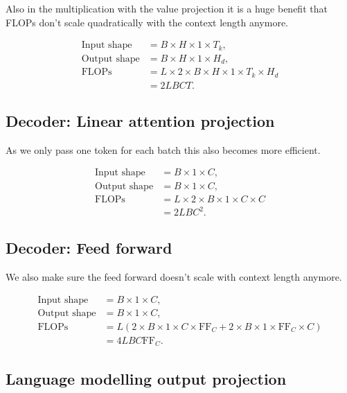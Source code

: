 \documentclass{article}
\begin{document}
Also in the multiplication with the value projection it is a huge benefit that FLOPs don't scale quadratically with the context length anymore.

\begin{align}
\text{Input shape}  &= \boxed{B \times H \times 1 \times T_k}, \\
\text{Output shape} &= \boxed{B \times H \times 1 \times H_d}, \\
\text{FLOPs}
   &= L \times 2 \times B \times H \times 1 \times T_k \times H_d \\
   &= \boxed{2L BCT}.
\end{align}


\subsection{Decoder: Linear attention projection}

As we only pass one token for each batch this also becomes more efficient.

\begin{align}
\text{Input shape}  &= \boxed{B \times 1 \times C}, \\
\text{Output shape} &= \boxed{B \times 1 \times C}, \\
\text{FLOPs}
   &= L \times 2 \times B \times 1 \times C \times C\\
   &= \boxed{2LBC^2}.
\end{align}


\subsection{Decoder: Feed forward}

We also make sure the feed forward doesn't scale with context length anymore.

\begin{align}
\text{Input shape}  &= \boxed{B \times 1 \times C}, \\
\text{Output shape} &= \boxed{B \times 1 \times C}, \\
\text{FLOPs}
   &= L \left(
       2 \times B \times 1 \times C \times \mathrm{FF}_C
       + 2 \times B \times 1 \times \mathrm{FF}_C \times C
   \right) \\
   &= \boxed{4LBC\mathrm{FF}_C}.
\end{align}

\subsection{Language modelling output projection}
\end{document}
